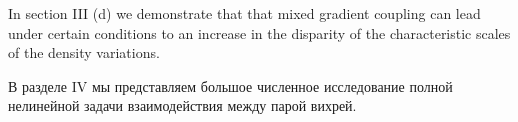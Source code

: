 In section III (d) we demonstrate that that mixed gradient coupling can lead 
under certain conditions to an increase in the disparity of the characteristic 
scales of the density variations.

В разделе IV мы представляем большое численное исследование полной нелинейной 
задачи взаимодействия между парой вихрей.
